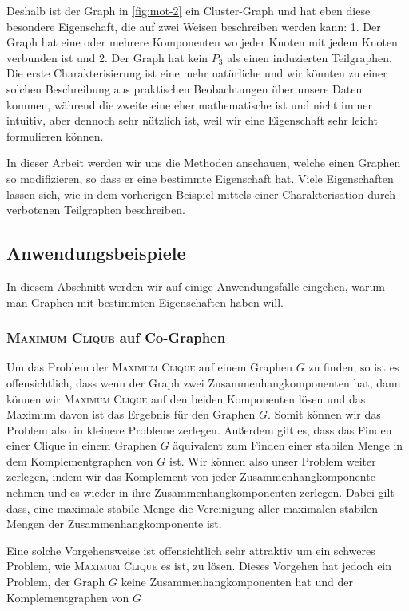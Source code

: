 \documentclass[12pt,a4paper,onecolumn,oneside,titlepage]{article}
\begin{document}
Deshalb ist der Graph in \ref{fig:mot-2} ein Cluster-Graph und hat eben diese besondere Eigenschaft, die auf zwei Weisen beschreiben werden kann: 1. Der Graph hat eine oder mehrere Komponenten wo jeder Knoten mit jedem Knoten verbunden ist und 2. Der Graph hat kein $P_3$ als einen induzierten Teilgraphen. Die erste Charakterisierung ist eine mehr natürliche und wir könnten zu einer solchen Beschreibung aus praktischen Beobachtungen über unsere Daten kommen, während die zweite eine eher mathematische ist und nicht immer intuitiv, aber dennoch sehr nützlich ist, weil wir eine Eigenschaft sehr leicht formulieren können.

In dieser Arbeit werden wir uns die Methoden anschauen, welche einen Graphen so modifizieren, so dass er eine bestimmte Eigenschaft hat. Viele Eigenschaften lassen sich, wie in dem vorherigen Beispiel mittels einer Charakterisation durch verbotenen Teilgraphen beschreiben.

\subsection{Anwendungsbeispiele}
\label{sec:examples}
In diesem Abschnitt werden wir auf einige Anwendungsfälle eingehen, warum man Graphen mit bestimmten Eigenschaften haben will.
\subsubsection{\textsc{Maximum Clique} auf Co-Graphen}
Um das Problem der \textsc{Maximum Clique} auf einem Graphen $G$ zu finden, so ist es offensichtlich, dass wenn der Graph zwei Zusammenhangkomponenten hat, dann können wir \textsc{Maximum Clique} auf den beiden Komponenten lösen und das Maximum davon ist das Ergebnis für den Graphen $G$. Somit können wir das Problem also in kleinere Probleme zerlegen.
Außerdem gilt es, dass das Finden einer Clique in einem Graphen $G$ äquivalent zum Finden einer stabilen Menge in dem Komplementgraphen  von $G$ ist.
Wir können also unser Problem weiter zerlegen, indem wir das Komplement von jeder Zusammenhangkomponente nehmen und es wieder in ihre Zusammenhangkomponenten zerlegen. Dabei gilt dass, eine maximale stabile Menge die Vereinigung aller maximalen stabilen Mengen der Zusammenhangkomponente ist.

Eine solche Vorgehensweise ist offensichtlich sehr attraktiv um ein schweres Problem, wie \textsc{Maximum Clique} es ist, zu lösen. Dieses Vorgehen hat jedoch ein Problem, der Graph $G$ keine Zusammenhangkomponenten hat und der Komplementgraphen von $G$
\end{document}
